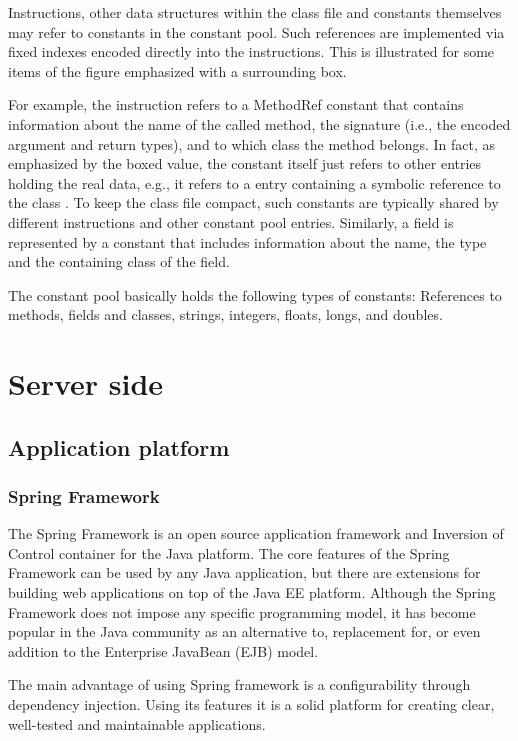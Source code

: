 Instructions, other data structures within the class file and constants
themselves may refer to constants in the constant pool. Such references are
implemented via fixed indexes encoded directly into the instructions. This is
illustrated for some items of the figure emphasized with a surrounding box.

For example, the  instruction refers to a MethodRef constant that
contains information about the name of the called method, the signature (i.e.,
the encoded argument and return types), and to which class the method belongs.
In fact, as emphasized by the boxed value, the  constant itself just
refers to other entries holding the real data, e.g., it refers to a
 entry containing a symbolic reference to the class
. To keep the class file compact, such constants are
typically shared by different instructions and other constant pool entries.
Similarly, a field is represented by a  constant that includes
information about the name, the type and the containing class of the field.

The constant pool basically holds the following types of constants: References
to methods, fields and classes, strings, integers, floats, longs, and doubles.


\section{Server side}

\subsection{Application platform}

\subsubsection{Spring Framework}
%
The Spring Framework is an open source application framework and Inversion of
Control container for the Java platform. The core features of the Spring
Framework can be used by any Java application, but there are extensions for
building web applications on top of the Java EE platform. Although the Spring
Framework does not impose any specific programming model, it has become popular
in the Java community as an alternative to, replacement for, or even addition to
the Enterprise JavaBean (EJB) model.

%
The main advantage of using Spring framework is a configurability through
dependency injection. Using its features it is a solid platform for creating
clear, well-tested and maintainable applications.


